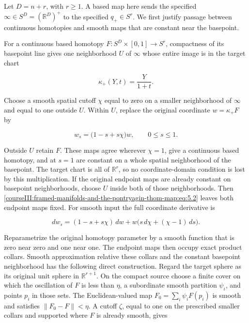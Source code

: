 Let \(D=n+r\), with \(r\geq1\). A based map here sends the specified \(\infty\in S^D=(\mathbb R^D)^+\) to the specified \(q_+\in S^r\). We first justify passage between continuous homotopies and smooth maps that are constant near the basepoint.

For a continuous based homotopy \(F:S^D\times[0,1]\to S^r\), compactness of its basepoint line gives one neighborhood \(U\) of \(\infty\) whose entire image is in the target chart

\begin{equation}
\kappa_+(Y,t)=\frac{Y}{1+t}.
 \label{courseIII:framed-manifolds-and-the-pontryagin-thom-map:eq:5.1}
\end{equation}

Choose a smooth spatial cutoff \(\chi\) equal to zero on a smaller neighborhood of \(\infty\) and equal to one outside \(U\). Within \(U\), replace the original coordinate \(w=\kappa_+F\) by

\begin{equation}
w_s=\bigl(1-s+s\chi\bigr)w,\qquad 0\leq s\leq1.
 \label{courseIII:framed-manifolds-and-the-pontryagin-thom-map:eq:5.2}
\end{equation}

Outside \(U\) retain \(F\). These maps agree wherever \(\chi=1\), give a continuous based homotopy, and at \(s=1\) are constant on a whole spatial neighborhood of the basepoint. The target chart is all of \(\mathbb R^r\), so no coordinate-domain condition is lost by this multiplication. If the original endpoint maps are already constant on basepoint neighborhoods, choose \(U\) inside both of those neighborhoods. Then \eqref{courseIII:framed-manifolds-and-the-pontryagin-thom-map:eq:5.2} leaves both endpoint maps fixed. For smooth input the full coordinate derivative is

\begin{equation}
dw_s=(1-s+s\chi)\,dw+
            w\bigl(s\,d\chi+(\chi-1)\,ds\bigr).
 \label{courseIII:framed-manifolds-and-the-pontryagin-thom-map:eq:5.3}
\end{equation}

Reparametrize the original homotopy parameter by a smooth function that is zero near zero and one near one. The endpoint maps then occupy exact product collars. Smooth approximation relative these collars and the constant basepoint neighborhood has the following direct construction. Regard the target sphere as its original unit sphere in \(\mathbb R^{r+1}\). On the compact source choose a finite cover on which the oscillation of \(F\) is less than \(\eta\), a subordinate smooth partition \(\psi_i\), and points \(p_i\) in those sets. The Euclidean-valued map \(F_0=\sum_i\psi_i F(p_i)\) is smooth and satisfies \(\|F_0-F\|<\eta\). A cutoff \(\zeta\), equal to one on the prescribed smaller collars and supported where \(F\) is already smooth, gives

